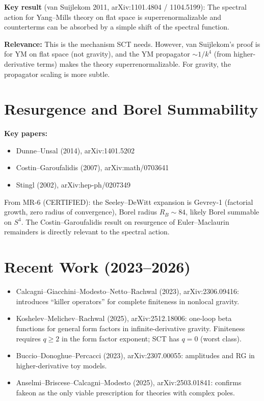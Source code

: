 \documentclass[12pt,a4paper]{article}
\begin{document}
\textbf{Key result} (van Suijlekom 2011, arXiv:1101.4804 / 1104.5199):
The spectral action for Yang--Mills theory on flat space is superrenormalizable
and counterterms can be absorbed by a simple shift of the spectral function.

\textbf{Relevance:} This is the mechanism SCT needs. However, van Suijlekom's
proof is for YM on flat space (not gravity), and the YM propagator
$\sim 1/k^4$ (from higher-derivative terms) makes the theory
superrenormalizable. For gravity, the propagator scaling is more subtle.

\section{Resurgence and Borel Summability}
\label{sec:resurgence}

\textbf{Key papers:}
\begin{itemize}
  \item Dunne--Unsal (2014), arXiv:1401.5202
  \item Costin--Garoufalidis (2007), arXiv:math/0703641
  \item Stingl (2002), arXiv:hep-ph/0207349
\end{itemize}

From MR-6 (CERTIFIED): the Seeley--DeWitt expansion is Gevrey-1
(factorial growth, zero radius of convergence), Borel radius $R_B \sim 84$,
likely Borel summable on $S^4$. The Costin--Garoufalidis result on
resurgence of Euler--Maclaurin remainders is directly relevant to the
spectral action.

\section{Recent Work (2023--2026)}
\label{sec:recent}

\begin{itemize}
  \item Calcagni--Giacchini--Modesto--Netto--Rachwal (2023),
    arXiv:2306.09416: introduces ``killer operators'' for complete
    finiteness in nonlocal gravity.
  \item Koshelev--Melichev--Rachwal (2025), arXiv:2512.18006:
    one-loop beta functions for general form factors in infinite-derivative
    gravity. Finiteness requires $q \geq 2$ in the form factor exponent;
    SCT has $q = 0$ (worst class).
  \item Buccio--Donoghue--Percacci (2023), arXiv:2307.00055:
    amplitudes and RG in higher-derivative toy models.
  \item Anselmi--Briscese--Calcagni--Modesto (2025), arXiv:2503.01841:
    confirms fakeon as the only viable prescription for theories with
    complex poles.
\end{itemize}
\end{document}

